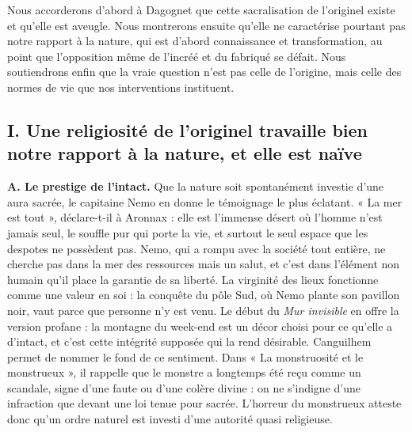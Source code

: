 \documentclass[11pt,a4paper]{article}
\begin{document}
Nous accorderons d'abord à Dagognet que cette sacralisation de l'originel existe et qu'elle est aveugle. Nous montrerons ensuite qu'elle ne caractérise pourtant pas notre rapport à la nature, qui est d'abord connaissance et transformation, au point que l'opposition même de l'incréé et du fabriqué se défait. Nous soutiendrons enfin que la vraie question n'est pas celle de l'origine, mais celle des normes de vie que nos interventions instituent.

\hypertarget{i.-une-religiosituxe9-de-loriginel-travaille-bien-notre-rapport-uxe0-la-nature-et-elle-est-nauxefve}{%
\subsection{I. Une religiosité de l'originel travaille bien notre rapport à la nature, et elle est naïve}\label{i.-une-religiosituxe9-de-loriginel-travaille-bien-notre-rapport-uxe0-la-nature-et-elle-est-nauxefve}}

\textbf{A. Le prestige de l'intact.} Que la nature soit spontanément investie d'une aura sacrée, le capitaine Nemo en donne le témoignage le plus éclatant. « La mer est tout », déclare-t-il à Aronnax : elle est l'immense désert où l'homme n'est jamais seul, le souffle pur qui porte la vie, et surtout le seul espace que les despotes ne possèdent pas. Nemo, qui a rompu avec la société tout entière, ne cherche pas dans la mer des ressources mais un salut, et c'est dans l'élément non humain qu'il place la garantie de sa liberté. La virginité des lieux fonctionne comme une valeur en soi : la conquête du pôle Sud, où Nemo plante son pavillon noir, vaut parce que personne n'y est venu. Le début du \emph{Mur invisible} en offre la version profane : la montagne du week-end est un décor choisi pour ce qu'elle a d'intact, et c'est cette intégrité supposée qui la rend désirable. Canguilhem permet de nommer le fond de ce sentiment. Dans « La monstruosité et le monstrueux », il rappelle que le monstre a longtemps été reçu comme un scandale, signe d'une faute ou d'une colère divine : on ne s'indigne d'une infraction que devant une loi tenue pour sacrée. L'horreur du monstrueux atteste donc qu'un ordre naturel est investi d'une autorité quasi religieuse.
\end{document}
